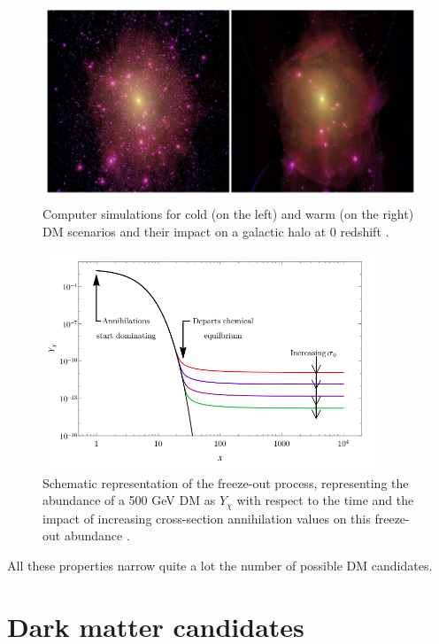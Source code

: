 \documentclass[a4paper, 10pt, openright]{report}
\begin{document}
\begin{figure}[htbp]
\begin{center}
\includegraphics[width=14cm, height=6cm]{figs/ColdWarmDM.png}
\caption{Computer simulations for cold (on the left) and warm (on the right) \ac{DM} scenarios and their impact on a galactic halo at 0 redshift \cite{ColdWarmDM}.}
\label{figure:ColdWarmDM}
\end{center}
\end{figure}

\begin{figure}[htbp]
\begin{center}
\includegraphics[width=10cm, height=6.5cm]{figs/FreezeOut.png}
\caption{Schematic representation of the freeze-out process, representing the abundance of a 500 GeV \ac{DM} as $Y_\chi$ with respect to the time and the impact of increasing cross-section annihilation values on this freeze-out abundance \cite{FreezeOut2}.}
\label{figure:FreezeOut}
\end{center}
\end{figure}

All these properties narrow quite a lot the number of possible \ac{DM} candidates.

\section{Dark matter candidates} \label{section:DMCandidates}
\end{document}
